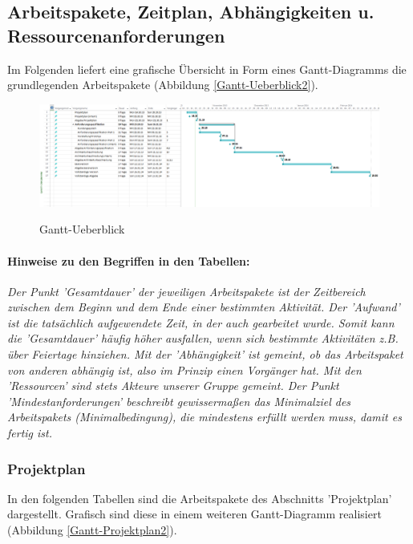 \documentclass[fontsize=12pt,paper=a4,twoside]{scrartcl}
\begin{document}
\subsection{Arbeitspakete, Zeitplan, Abhängigkeiten u. Ressourcenanforderungen}\label{aps}

Im Folgenden liefert eine grafische Übersicht in Form eines Gantt-Diagramms die grundlegenden Arbeitspakete (Abbildung \ref{Gantt-Ueberblick2}).\\

\begin{figure}[htbp]
\caption{Gantt-Ueberblick}
\includegraphics[angle = 90, scale=0.5]{gantt-ueberblick2.png}
\label{Gantt-Ueberblick}
\end{figure}

\paragraph{Hinweise zu den Begriffen in den Tabellen:} \textit{Der Punkt 'Gesamtdauer' der jeweiligen Arbeitspakete ist der Zeitbereich zwischen dem Beginn und dem Ende einer bestimmten Aktivität. Der 'Aufwand' ist die tatsächlich aufgewendete Zeit, in der auch gearbeitet wurde. Somit kann die 'Gesamtdauer' häufig höher ausfallen, wenn sich bestimmte Aktivitäten z.B. über Feiertage hinziehen. Mit der 'Abhängigkeit' ist gemeint, ob das Arbeitspaket von anderen abhängig ist, also im Prinzip einen Vorgänger hat. Mit den 'Ressourcen' sind stets Akteure unserer Gruppe gemeint. Der Punkt 'Mindestanforderungen' beschreibt gewissermaßen das Minimalziel des Arbeitspakets (Minimalbedingung), die mindestens erfüllt werden muss, damit es fertig ist.}\\

\subsubsection{Projektplan}\label{aps}

In den folgenden Tabellen sind die Arbeitspakete des Abschnitts 'Projektplan' dargestellt. Grafisch sind diese in einem weiteren Gantt-Diagramm realisiert (Abbildung \ref{Gantt-Projektplan2}). \\
\end{document}
